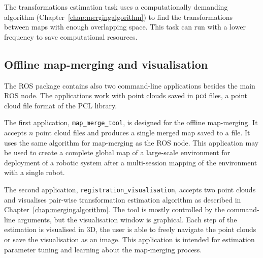 The transformations estimation task uses a computationally demanding algorithm (Chapter~\ref{chap:mergingalgorithm}) to find the transformations between maps with enough overlapping space. This task can run with a lower frequency to save computational resources.

\subsection{Offline map-merging and visualisation}
\label{sec:commandline-tools}

The \gls{ROS} package contains also two command-line applications besides the main \gls{ROS} node. The applications work with point clouds saved in \texttt{pcd} files, a point cloud file format of the \gls{PCL} library.

The first application, \texttt{map\_merge\_tool}, is designed for the offline map-merging. It accepts $n$ point cloud files and produces a single merged map saved to a file. It uses the same algorithm for map-merging as the \gls{ROS} node. This application may be used to create a complete global map of a large-scale environment for deployment of a robotic system after a multi-session mapping of the environment with a single robot.

The second application, \texttt{registration\_visualisation}, accepts two point clouds and visualises pair-wise transformation estimation algorithm as described in Chapter~\ref{chap:mergingalgorithm}. The tool is mostly controlled by the command-line arguments, but the visualisation window is graphical. Each step of the estimation is visualised in \gls{3D}, the user is able to freely navigate the point clouds or save the visualisation as an image. This application is intended for estimation parameter tuning and learning about the map-merging process.

